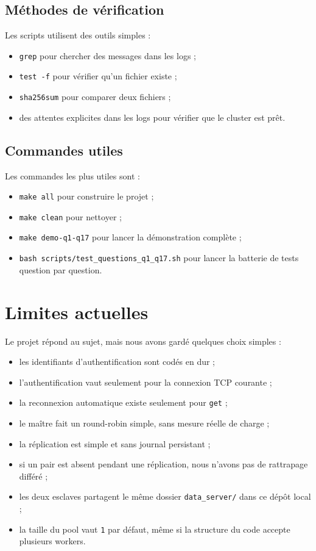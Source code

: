 \documentclass[a4paper,11pt]{article}
\begin{document}
\subsection{Méthodes de vérification}

Les scripts utilisent des outils simples :

\begin{itemize}[leftmargin=*]
    \item \texttt{grep} pour chercher des messages dans les logs ;
    \item \texttt{test -f} pour vérifier qu'un fichier existe ;
    \item \texttt{sha256sum} pour comparer deux fichiers ;
    \item des attentes explicites dans les logs pour vérifier que le cluster est prêt.
\end{itemize}

\subsection{Commandes utiles}

Les commandes les plus utiles sont :

\begin{itemize}[leftmargin=*]
    \item \texttt{make all} pour construire le projet ;
    \item \texttt{make clean} pour nettoyer ;
    \item \texttt{make demo-q1-q17} pour lancer la démonstration complète ;
    \item \texttt{bash scripts/test\_questions\_q1\_q17.sh} pour lancer la batterie de tests question par question.
\end{itemize}
\newpage
\section{Limites actuelles}

Le projet répond au sujet, mais nous avons gardé quelques choix simples :

\begin{itemize}[leftmargin=*]
    \item les identifiants d'authentification sont codés en dur ;
    \item l'authentification vaut seulement pour la connexion TCP courante ;
    \item la reconnexion automatique existe seulement pour \texttt{get} ;
    \item le maître fait un round-robin simple, sans mesure réelle de charge ;
    \item la réplication est simple et sans journal persistant ;
    \item si un pair est absent pendant une réplication, nous n'avons pas de rattrapage différé ;
    \item les deux esclaves partagent le même dossier \texttt{data\_server/} dans ce dépôt local ;
    \item la taille du pool vaut \texttt{1} par défaut, même si la structure du code accepte plusieurs workers.
\end{itemize}
\end{document}
